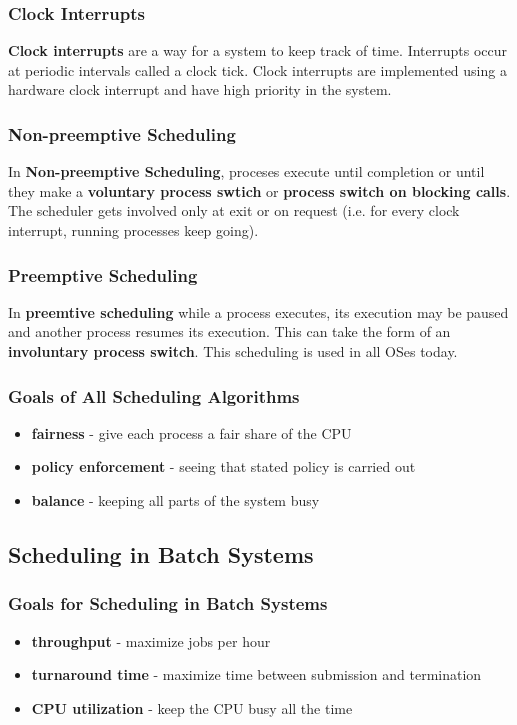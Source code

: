 \documentclass{article}
\renewcommand{\b}{\item[$\circ$]}
\newcommand{\newlist}{\begin{itemize}}
\renewcommand{\endlist}{\end{itemize}}
\begin{document}
    \subsubsection{Clock Interrupts}

    \textbf{Clock interrupts} are a way for a system to keep track of time. Interrupts occur at periodic intervals called a clock tick. Clock interrupts are implemented using a hardware clock interrupt and have high priority in the system. 

    \subsubsection{Non-preemptive Scheduling}
    
    In \textbf{Non-preemptive Scheduling}, proceses execute until completion or until they make a \textbf{voluntary process swtich} or \textbf{process switch on blocking calls}. The scheduler gets involved only at exit or on request (i.e. for every clock interrupt, running processes keep going).

    \subsubsection{Preemptive Scheduling}

    In \textbf{preemtive scheduling} while a process executes, its execution may be paused and another process resumes its execution. This can take the form of an \textbf{involuntary process switch}. This scheduling is used in all OSes today. 

    \subsubsection{Goals of All Scheduling Algorithms}

    \newlist
    \b \textbf{fairness} - give each process a fair share of the CPU
    \b \textbf{policy enforcement} - seeing that stated policy is carried out
    \b \textbf{balance} - keeping all parts of the system busy
    \endlist
        
\subsection{Scheduling in Batch Systems}

    \subsubsection{Goals for Scheduling in Batch Systems}
    \newlist
    \b \textbf{throughput} - maximize jobs per hour
    \b \textbf{turnaround time} - maximize time between submission and termination
    \b \textbf{CPU utilization} - keep the CPU busy all the time
    \endlist
\end{document}
